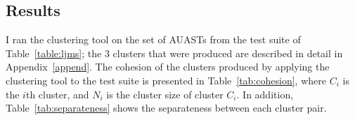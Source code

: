 






\subsection{Results}  \label{study3-results}


I ran the clustering tool on the set of AUASTs from the test suite of Table~\ref{table:ljms}; the 3 clusters that were produced are described in detail in Appendix~\ref{append}. The cohesion of the clusters produced by applying the clustering tool to the test suite is presented in Table~\ref{tab:cohesion}, where $C_i$ is the  $i$th cluster, and $N_i$ is the cluster size of cluster ${C_i}$. In addition, Table~\ref{tab:separateness} shows the separateness between each cluster pair.


